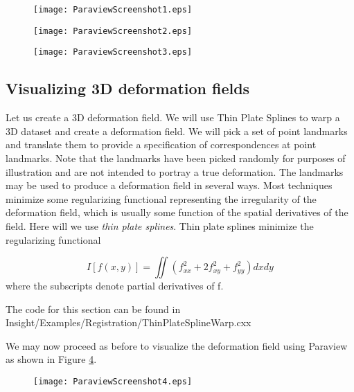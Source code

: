 \begin{figure}
\center
\texttt{[image: ParaviewScreenshot1.eps]}
\label{fig:ParaviewScreenshot1}
\end{figure}

\begin{figure}
\center
\texttt{[image: ParaviewScreenshot2.eps]}
\label{fig:ParaviewScreenshot2}
\end{figure}

\begin{figure}
\center
\texttt{[image: ParaviewScreenshot3.eps]}
\label{fig:ParaviewScreenshot3}
\end{figure}



\subsection{Visualizing 3D deformation fields}
Let us create a 3D deformation field. We will use Thin Plate Splines to warp a 3D dataset and create a deformation field. We will pick a set of point landmarks and translate them to provide a specification of correspondences at point landmarks. Note that the landmarks have been picked randomly for purposes of illustration and are not intended to portray a true deformation. The landmarks may be used to produce a deformation field in several ways. Most techniques minimize some regularizing functional representing the irregularity of the deformation field, which is usually some function of the spatial derivatives of the field. Here will we use {\it thin plate splines}. Thin plate splines minimize the regularizing functional 

\begin{equation}
I[f(x,y)] = \iint (f^2_{xx} + 2 f^2_{xy} + f^2_{yy}) dx dy
\end{equation}
where the subscripts denote partial derivatives of f.

The code for this section can be found in Insight/Examples/Registration/ThinPlateSplineWarp.cxx

We may now proceed as before to visualize the deformation field using Paraview as shown in Figure \ref{fig:ParaviewScreenshot4}.

\begin{figure}
\center
\texttt{[image: ParaviewScreenshot4.eps]}
\label{fig:ParaviewScreenshot4}
\end{figure}



